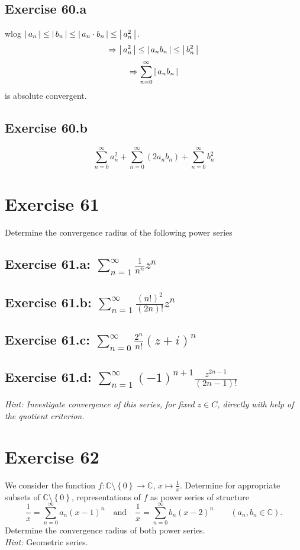 \documentclass[a4paper]{article}
\theoremstyle{definition}
\newcommand\abs[1]{\left|\thinspace #1\thinspace\right|}
\newcommand\set[1]{\left\{#1\right\}}
\begin{document}
\subsection{Exercise 60.a}
wlog $\abs{a_n} \leq \abs{b_n} \leq \abs{a_n \cdot b_n} \leq \abs{a_n^2}$.
\[ \Rightarrow \abs{a_n^2} \leq \abs{a_n b_n} \leq \abs{b_n^2} \]
\[ \Rightarrow \sum_{n=0}^\infty \abs{a_n b_n} \]
is absolute convergent.

\subsection{Exercise 60.b}
\[ \sum_{n=0}^\infty a_n^2 + \sum_{n=0}^\infty (2 a_n b_n) + \sum_{n=0}^\infty b_n^2 \]

\section{Exercise 61}
\begin{ex}
  Determine the convergence radius of the following power series
\end{ex}

\subsection{Exercise 61.a: $\sum_{n=1}^\infty \frac1{n^n} z^n$}
\subsection{Exercise 61.b: $\sum_{n=1}^\infty \frac{(n!)^2}{(2n)!} z^n$}
\subsection{Exercise 61.c: $\sum_{n=0}^\infty \frac{2^n}{n!} (z + i)^n$}
\subsection{Exercise 61.d: $\sum_{n=1}^\infty (-1)^{n+1} \frac{z^{2n-1}}{(2n - 1)!}$}
\emph{Hint: Investigate convergence of this series, for fixed $z \in C$, directly with help of the quotient criterion.}

\section{Exercise 62}
\begin{ex}
  We consider the function $f: \mathbb C \setminus \set{0} \rightarrow \mathbb C$, $x \mapsto \frac1x$.
  Determine for appropriate subsets of $\mathbb C \setminus \set{0}$, representations of $f$ as power series of structure
  \[
    \frac1x = \sum_{n=0}^\infty a_n (x - 1)^n
    \quad\text{and}\quad
    \frac1x = \sum_{n=0}^\infty b_n (x-2)^n
    \qquad (a_n, b_n \in \mathbb C).
  \]
  Determine the convergence radius of both power series. \\
  \emph{Hint:} Geometric series.
\end{ex}
\end{document}
